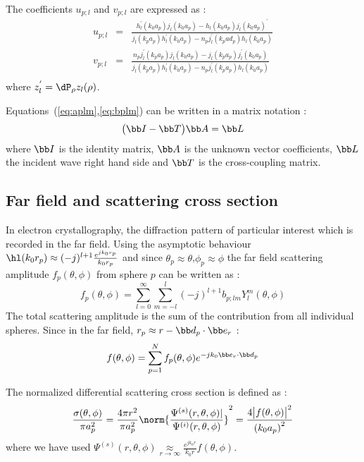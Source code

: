 The coefficients $u_{p;l}$ and $v_{p;l}$ are expressed as :
\begin{eqnarray*}
  u_{p;l} &=& \frac{h_l^{'}(k_0a_p)j_l(k_0a_p) - h_l(k_0a_p)j_l(k_0a_p)^{'}}
    {j_l(k_pa_p)h_l^{'}(k_0a_p)-n_pj_l^{'}(k_pad_p)h_l(k_0a_p)} \\
  v_{p;l} &=& \frac{n_pj_l^{'}(k_pa_p)j_l(k_0a_p) - j_l(k_pa_p)j_l^{'}(k_0a_p)}
    {j_l(k_pa_p)h_l^{'}(k_0a_p)-n_pj_l^{'}(k_pa_p)h_l(k_0a_p)} \\
\end{eqnarray*}
%
where $z_l^{'}=\dP_{\rho}z_l(\rho)$.

Equations~(\ref{eq:aplm},\ref{eq:bplm}) can be written in a matrix notation :
%
\begin{equation}\label{eq:Tsystem}
  \big(\bb I - \bb T \big)\bb A = \bb L
\end{equation}
%
where
$\bb I$ is the identity matrix,
$\bb A$ is the unknown vector coefficients,
$\bb L$ the incident wave right hand side and
$\bb T$ is the cross-coupling matrix.


\subsection{Far field and scattering cross section}
In electron crystallography, the diffraction pattern of particular
interest which is recorded in the far field. Using the asymptotic
behaviour $\hl(k_0r_p)\approx (-j)^{l+1}\frac{e^{jk_0r_p}}{k_0r_p}$
and since $\theta_p\approx\theta$,$\phi_p\approx\phi$
the far field scattering amplitude $f_p(\theta,\phi)$ from sphere $p$ can
be written as :
%
\begin{equation}\label{eq:fp_theta}
  f_p(\theta,\phi) = \sum_{l=0}^{\infty}\sum_{m=-l}^{l} (-j)^{l+1}b_{p;lm}Y_l^m(\theta,\phi)
\end{equation}
%
The total scattering amplitude is the sum of the contribution from all
individual spheres.
Since in the far field, $r_p\approx r-\bb d_p\cdot\bb e_r$ :
%
\begin{equation}\label{eq:f_theta}
  f(\theta,\phi) = \sum_{p=1}^{N} f_p(\theta,\phi)e^{-jk_0\bb e_r\cdot\bb d_p}
\end{equation}
%

The normalized differential scattering cross section is defined as :
%
\begin{equation}\label{eq:sigma}
  \frac{\sigma(\theta,\phi)}{\pi a_p^2}
  = \frac{4\pi r^2}{\pi a_p^2}
    \norm{\frac{\Psi^{(s)}(r,\theta,\phi)|}{\Psi^{(i)}(r,\theta,\phi)}}^2
  = \frac{4\bigl|f(\theta,\phi)\bigr|^2}{\left(k_0a_p\right)^2}
\end{equation}
%
where we have used
$\Psi^{(s)}(r,\theta,\phi) \underset{r\rightarrow\infty}\approx \frac{e^{jk_0r}}{k_0r}f(\theta,\phi)$.





